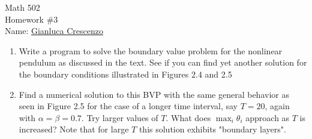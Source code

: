 \documentclass[11pt,twoside,openany]{memoir}
\begin{document}
\begin{center}
    {\Large Math 502 \\[0.1in]Homework \#3}\\[.175in]
    {Name:} {\underline{Gianluca Crescenzo\hspace*{2in}}}\\[0.15in]
    \end{center}
    \vspace{4pt}
\begin{exercise}[manual-num={2.7}]
    \phantom{a}
    \begin{enumerate}[label = (\alph*),itemsep=1pt,topsep=3pt]
        \item Write a program to solve the boundary value problem for the nonlinear pendulum as discussed in the text. See if you can find yet another solution for the boundary conditions illustrated in Figures 2.4 and 2.5
        \item Find a numerical solution to this BVP with the same general behavior as seen in Figure 2.5 for the case of a longer time interval, say $T = 20$, again with $\alpha = \beta = 0.7$. Try larger values of $T$. What does $\max_{i}\theta_i$ approach as $T$ is increased? Note that for large $T$ this solution exhibits "boundary layers".
    \end{enumerate}
\end{exercise}
\end{document}
